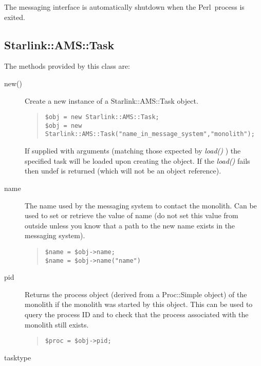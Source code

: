 \documentclass[twoside,11pt]{article}
\newenvironment{myquote}{\begin{quote}\begin{small}}{\end{small}\end{quote}}
\newcommand{\perl}{\xref{\textsf{Perl}}{sun193}{}}
\newcommand{\xref}[3]{#1}
\renewcommand{\_}{\texttt{\symbol{95}}}
\begin{document}
The messaging interface is automatically shutdown when the \perl\ process is
exited.

\subsection{Starlink::AMS::Task}

The methods provided by this class are:

\begin{description}

\item[new()] \mbox{}

Create a new instance of a Starlink::AMS::Task object.
\begin{myquote}
\begin{verbatim}
$obj = new Starlink::AMS::Task;
$obj = new Starlink::AMS::Task("name_in_message_system","monolith");
\end{verbatim}
\end{myquote}

If supplied with arguments (matching those expected by {\em load()\/} ) the
specified task will be loaded upon creating the object. If the {\em load()\/}
fails then undef is returned (which will not be an object reference).

\item[name] \mbox{}

The name used by the messaging system to contact the monolith.
Can be used to set or retrieve the value of name (do not set
this value from outside unless you know that a path to the
new name exists in the messaging system).
\begin{myquote}
\begin{verbatim}
$name = $obj->name;
$name = $obj->name("name")
\end{verbatim}
\end{myquote}

\item[pid] \mbox{}

Returns the process object (derived from a Proc::Simple object)
of the monolith if the monolith was started by this object.
This can be used to query the process ID and to check that
the process associated with the monolith still exists.
\begin{myquote}
\begin{verbatim}
$proc = $obj->pid;
\end{verbatim}
\end{myquote}

\item[tasktype] \mbox{}


\end{description}
\end{document}

